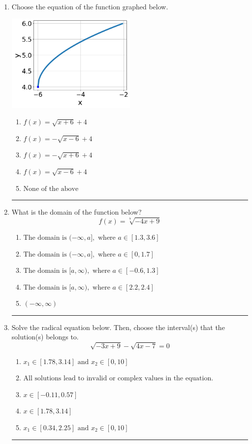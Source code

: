 \documentclass[14pt]{extbook}
\newcommand{\litem}[1]{\item#1\hspace*{-1cm}\rule{\textwidth}{0.4pt}}
\begin{document}
\begin{enumerate}
\litem{
Choose the equation of the function graphed below.
\begin{center}
    \includegraphics[width=0.5\textwidth]{../Figures/radicalGraphToEquationB.png}
\end{center}
\begin{enumerate}[label=\Alph*.]
\item \( f(x) = \sqrt{x + 6} + 4 \)
\item \( f(x) = - \sqrt{x - 6} + 4 \)
\item \( f(x) = - \sqrt{x + 6} + 4 \)
\item \( f(x) = \sqrt{x - 6} + 4 \)
\item \( \text{None of the above} \)

\end{enumerate} }
\litem{
What is the domain of the function below?\[ f(x) = \sqrt[7]{-4 x + 9} \]\begin{enumerate}[label=\Alph*.]
\item \( \text{The domain is } (-\infty, a], \text{   where } a \in [1.3, 3.6] \)
\item \( \text{The domain is } (-\infty, a], \text{   where } a \in [0, 1.7] \)
\item \( \text{The domain is } [a, \infty), \text{   where } a \in [-0.6, 1.3] \)
\item \( \text{The domain is } [a, \infty), \text{   where } a \in [2.2, 2.4] \)
\item \( (-\infty, \infty) \)

\end{enumerate} }
\litem{
Solve the radical equation below. Then, choose the interval(s) that the solution(s) belongs to.\[ \sqrt{-3 x + 9} - \sqrt{4 x - 7} = 0 \]\begin{enumerate}[label=\Alph*.]
\item \( x_1 \in [1.78, 3.14] \text{ and } x_2 \in [0,10] \)
\item \( \text{All solutions lead to invalid or complex values in the equation.} \)
\item \( x \in [-0.11,0.57] \)
\item \( x \in [1.78,3.14] \)
\item \( x_1 \in [0.34, 2.25] \text{ and } x_2 \in [0,10] \)


\end{enumerate}}
\end{enumerate}
\end{document}
